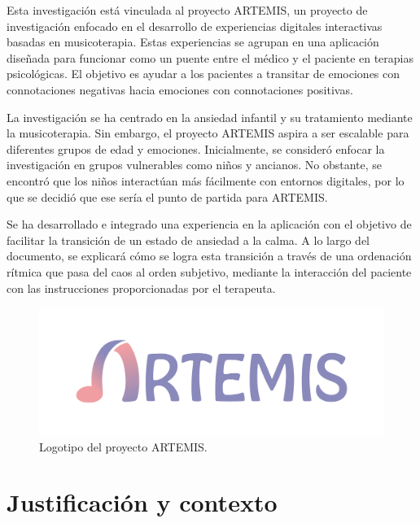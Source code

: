 Esta investigación está vinculada al proyecto ARTEMIS, un proyecto de investigación enfocado en el desarrollo de experiencias digitales interactivas basadas en musicoterapia. Estas experiencias se agrupan en una aplicación diseñada para funcionar como un puente entre el médico y el paciente en terapias psicológicas. El objetivo es ayudar a los pacientes a transitar de emociones con connotaciones negativas hacia emociones con connotaciones positivas.

La investigación se ha centrado en la ansiedad infantil y su tratamiento mediante la musicoterapia. Sin embargo, el proyecto ARTEMIS aspira a ser escalable para diferentes grupos de edad y emociones. Inicialmente, se consideró enfocar la investigación en grupos vulnerables como niños y ancianos. No obstante, se encontró que los niños interactúan más fácilmente con entornos digitales, por lo que se decidió que ese sería el punto de partida para ARTEMIS.

Se ha desarrollado e integrado una experiencia en la aplicación con el objetivo de facilitar la transición de un estado de ansiedad a la calma. A lo largo del documento, se explicará cómo se logra esta transición a través de una ordenación rítmica que pasa del caos al orden subjetivo, mediante la interacción del paciente con las instrucciones proporcionadas por el terapeuta.

\begin{figure} [h!]
	\centering
	\includegraphics[width=0.9\linewidth]{Figuras/Introduccion/1_LogoArtemis}
	\caption{Logotipo del proyecto ARTEMIS.}
	\label{fig:logoArtemis}
\end{figure}

\section{Justificación y contexto}

